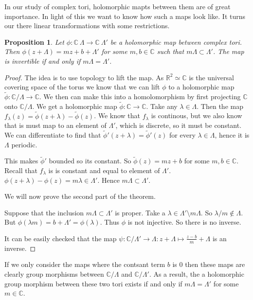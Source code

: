 \documentclass[a4paper]{article}
\theoremstyle{theoremdd}
\newtheorem{proposition}[theorem]{Proposition}
\theoremstyle{definitiondd}
\theoremstyle{remarkdd}
\newcommand{\C}{\mathbb{C}}
\newcommand{\R}{\mathbb{R}}
\newcommand{\ltr}{\par \noindent \framebox[1\width]{ $\implies$ } \hspace{.2cm}}
\newcommand{\rtl}{\par \noindent \framebox[1\width]{ $\impliedby$ } \hspace{.2cm} }
\begin{document}
In our study of complex tori, holomorphic mapts between them are of great importance. 
In light of this we want to know how such a maps look like. It turns our there linear transformations with some restrictions. 
\begin{proposition}
	Let $\phi: \C \ \Lambda \to \C \ \Lambda'$ be a holomorphic map between complex tori. 
	Then $\phi(z + \Lambda) = mz + b + \Lambda'$ for some $m, b \in \C$ such that $m \Lambda \subset  \Lambda'$. 
	The map is invertible if and only if $m \Lambda = \Lambda'$.
\end{proposition}
\begin{proof}
	The idea is to use topology to lift the map. As $\R^2 \simeq \C$ is the universal covering space of the torus we know that we can lift $\phi$ to a holomorphic map $\tilde \phi: \C / \Lambda \to \C$. We then can make this into a homolomorphism by first projecting $\C$ onto $\C / \Lambda$. We get a holomorphic map  $\tilde \phi: \C \to \C$.
	Take any $\lambda \in \Lambda$. 
	Then the map $f_\lambda(z) = \tilde\phi(z + \lambda) - \tilde \phi(z)$. We know that $f_{\lambda}$ is continous, but we also know that is must map to an element of $\Lambda'$, which is discrete, so it must be constant. 
	We can differentiate to find that $\tilde\phi'(z+ \lambda) = \tilde\phi'(z)$ for every $\lambda \in \Lambda$, hence it is  $\Lambda$ periodic. 

	This makes $\tilde\phi'$ bounded so its constant. 
	So $\tilde \phi(z) = mz + b$ for some $m, b \in \C$. 
	Recall that $f_{\lambda}$ is is constant and equal to element of $\Lambda'$. 
	$\phi(z+\lambda) - \phi(z) = m\lambda \in \Lambda'$. 
	Hence $m \Lambda \subset \Lambda'$.

	We will now prove the second part of the theorem.
	\ltr Suppose that the inclusion  $m\Lambda \subset \Lambda'$ is proper. 
	Take a $\lambda \in \Lambda' \setminus m\Lambda$. 
	So $\lambda / m \not\in  \Lambda$. But $\phi(\lambda m) = b + \Lambda' = \phi(\lambda)$. Thus $\phi$ is not injective. So there is no inverse.
	\rtl It can be easily checked that the map $\psi: \C / \Lambda' \to \Lambda: z + \Lambda \mapsto  \frac{z-b}{m} + \Lambda$ is an inverse. 
\end{proof}
If we only consider the maps where the contsant term $b$ is $0$ then these maps are clearly group morphisms between $\C / \Lambda$ and  $\C / \Lambda'$. 
As a result, the a holomorphic group morphism between these two tori exists if and only if $m\Lambda = \Lambda'$ for some $m \in \C$. 

\end{document}
